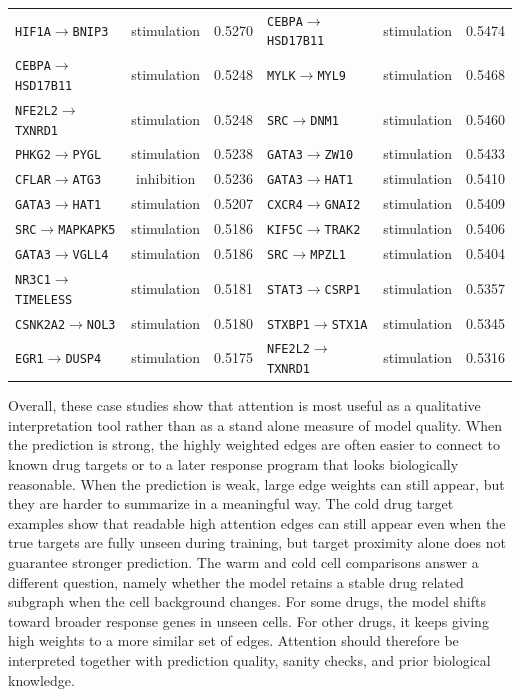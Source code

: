 \begin{table}[htbp]
\begin{tabular}{lcllcl}
\texttt{HIF1A}$\rightarrow$\texttt{BNIP3} & stimulation & 0.5270 & \texttt{CEBPA}$\rightarrow$\texttt{HSD17B11} & stimulation & 0.5474 \\
\texttt{CEBPA}$\rightarrow$\texttt{HSD17B11} & stimulation & 0.5248 & \texttt{MYLK}$\rightarrow$\texttt{MYL9} & stimulation & 0.5468 \\
\texttt{NFE2L2}$\rightarrow$\texttt{TXNRD1} & stimulation & 0.5248 & \texttt{SRC}$\rightarrow$\texttt{DNM1} & stimulation & 0.5460 \\
\texttt{PHKG2}$\rightarrow$\texttt{PYGL} & stimulation & 0.5238 & \texttt{GATA3}$\rightarrow$\texttt{ZW10} & stimulation & 0.5433 \\
\texttt{CFLAR}$\rightarrow$\texttt{ATG3} & inhibition & 0.5236 & \texttt{GATA3}$\rightarrow$\texttt{HAT1} & stimulation & 0.5410 \\
\texttt{GATA3}$\rightarrow$\texttt{HAT1} & stimulation & 0.5207 & \texttt{CXCR4}$\rightarrow$\texttt{GNAI2} & stimulation & 0.5409 \\
\texttt{SRC}$\rightarrow$\texttt{MAPKAPK5} & stimulation & 0.5186 & \texttt{KIF5C}$\rightarrow$\texttt{TRAK2} & stimulation & 0.5406 \\
\texttt{GATA3}$\rightarrow$\texttt{VGLL4} & stimulation & 0.5186 & \texttt{SRC}$\rightarrow$\texttt{MPZL1} & stimulation & 0.5404 \\
\texttt{NR3C1}$\rightarrow$\texttt{TIMELESS} & stimulation & 0.5181 & \texttt{STAT3}$\rightarrow$\texttt{CSRP1} & stimulation & 0.5357 \\
\texttt{CSNK2A2}$\rightarrow$\texttt{NOL3} & stimulation & 0.5180 & \texttt{STXBP1}$\rightarrow$\texttt{STX1A} & stimulation & 0.5345 \\
\texttt{EGR1}$\rightarrow$\texttt{DUSP4} & stimulation & 0.5175 & \texttt{NFE2L2}$\rightarrow$\texttt{TXNRD1} & stimulation & 0.5316 \\
\hline
\end{tabular}
\end{table}
\noindent Overall, these case studies show that attention is most useful as a qualitative interpretation tool rather than as a stand alone measure of model quality. When the prediction is strong, the highly weighted edges are often easier to connect to known drug targets or to a later response program that looks biologically reasonable. When the prediction is weak, large edge weights can still appear, but they are harder to summarize in a meaningful way. The cold drug target examples show that readable high attention edges can still appear even when the true targets are fully unseen during training, but target proximity alone does not guarantee stronger prediction. The warm and cold cell comparisons answer a different question, namely whether the model retains a stable drug related subgraph when the cell background changes. For some drugs, the model shifts toward broader response genes in unseen cells. For other drugs, it keeps giving high weights to a more similar set of edges. Attention should therefore be interpreted together with prediction quality, sanity checks, and prior biological knowledge.
